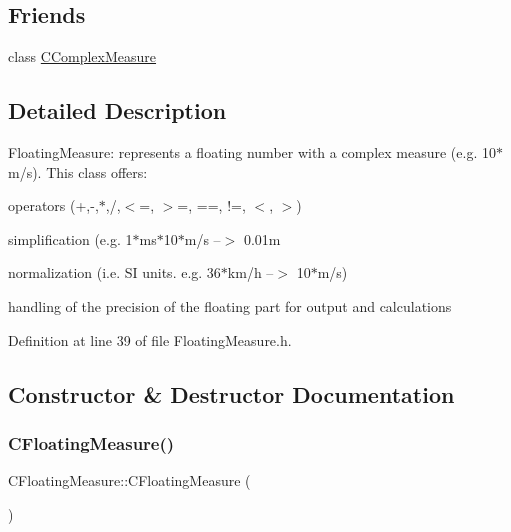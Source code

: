 \subsection*{Friends}
\begin{DoxyCompactItemize}
\item 
class \hyperlink{classCFloatingMeasure_a2af9f0d4f7a8de5099b8d23df211b616}{C\+Complex\+Measure}
\end{DoxyCompactItemize}


\subsection{Detailed Description}
Floating\+Measure\+: represents a floating number with a complex measure (e.\+g. 10$\ast$m/s). This class offers\+: 


\begin{DoxyItemize}
\item operators (+,-\/,$\ast$,/,$<$=, $>$=, ==, !=, $<$, $>$)
\item simplification (e.\+g. 1$\ast$ms$\ast$10$\ast$m/s --$>$ 0.\+01m
\item normalization (i.\+e. SI units. e.\+g. 36$\ast$km/h --$>$ 10$\ast$m/s)
\item handling of the precision of the floating part for output and calculations 
\end{DoxyItemize}

Definition at line 39 of file Floating\+Measure.\+h.



\subsection{Constructor \& Destructor Documentation}
\mbox{\label{classCFloatingMeasure_aa30b4d0ea6b6bbc022717c875419fb44}} 
\subsubsection{\texorpdfstring{C\+Floating\+Measure()}{CFloatingMeasure()}\hspace{0.1cm}{\footnotesize\ttfamily [1/3]}}
{\footnotesize\ttfamily C\+Floating\+Measure\+::\+C\+Floating\+Measure (\begin{DoxyParamCaption}{ }\end{DoxyParamCaption})}


